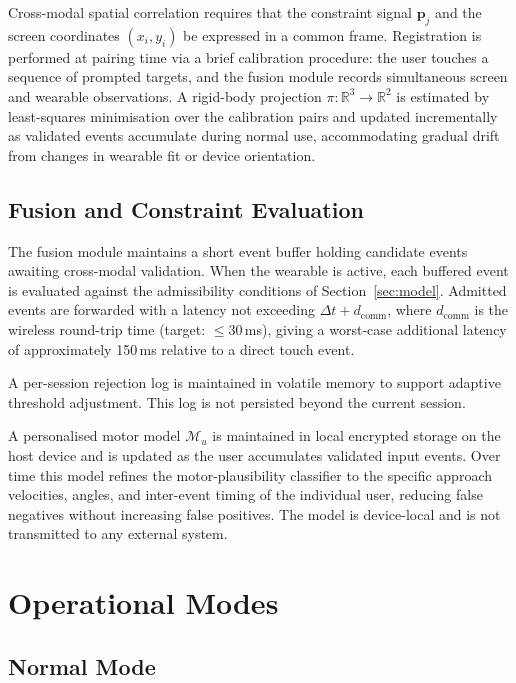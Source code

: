 \documentclass[11pt,letterpaper]{article}
\begin{document}
Cross-modal spatial correlation requires that the constraint signal $\mathbf{p}_j$
and the screen coordinates $(x_i, y_i)$ be expressed in a common frame. Registration
is performed at pairing time via a brief calibration procedure: the user touches a
sequence of prompted targets, and the fusion module records simultaneous screen and
wearable observations. A rigid-body projection $\pi : \mathbb{R}^3 \to \mathbb{R}^2$
is estimated by least-squares minimisation over the calibration pairs and updated
incrementally as validated events accumulate during normal use, accommodating
gradual drift from changes in wearable fit or device orientation.

\subsection{Fusion and Constraint Evaluation}

The fusion module maintains a short event buffer holding candidate events awaiting
cross-modal validation. When the wearable is active, each buffered event is evaluated
against the admissibility conditions of Section~\ref{sec:model}. Admitted events are
forwarded with a latency not exceeding $\Delta t + d_{\text{comm}}$, where
$d_{\text{comm}}$ is the wireless round-trip time (target: $\leq 30$\,ms), giving
a worst-case additional latency of approximately 150\,ms relative to a direct
touch event.

A per-session rejection log is maintained in volatile memory to support adaptive
threshold adjustment. This log is not persisted beyond the current session.

A personalised motor model $\mathcal{M}_u$ is maintained in local encrypted storage
on the host device and is updated as the user accumulates validated input events.
Over time this model refines the motor-plausibility classifier to the specific
approach velocities, angles, and inter-event timing of the individual user, reducing
false negatives without increasing false positives. The model is device-local and is
not transmitted to any external system.

\section{Operational Modes}
\label{sec:modes}

\subsection{Normal Mode}
\end{document}
